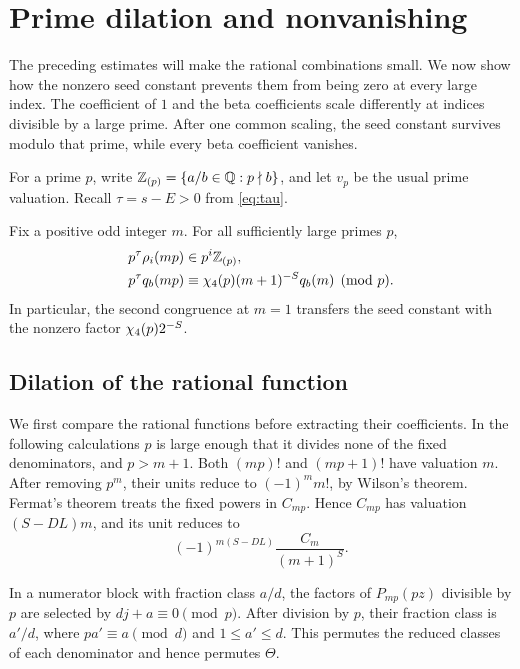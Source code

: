 \section{Prime dilation and nonvanishing}\label{sec:dilation}

The preceding estimates will make the rational combinations small.
We now show how the nonzero seed constant prevents them from being
zero at every large index. The coefficient of $1$ and the beta
coefficients scale differently at indices divisible by a large prime.
After one common scaling, the seed constant survives modulo that
prime, while every beta coefficient vanishes.

For a prime $p$, write
$\mathbb Z_{(p)}=\{a/b\in\mathbb Q:p\nmid b\}$, and let $v_p$ be the usual
prime valuation. Recall $\tau=s-E>0$ from \eqref{eq:tau}.

\begin{proposition}\label{prop:dilation}
Fix a positive odd integer $m$. For all sufficiently large primes $p$,
\begin{align}
 p^\tau\rho_i(mp)&\in p^i\mathbb Z_{(p)},\label{eq:rho-dilation}\\
 p^\tau q_b(mp)&\equiv
       \chi_4(p)(m+1)^{-S}q_b(m)\pmod p.\label{eq:q-dilation}
\end{align}
In particular, the second congruence at $m=1$ transfers the seed
constant with the nonzero factor $\chi_4(p)2^{-S}$.
\end{proposition}

\subsection{Dilation of the rational function}

We first compare the rational functions before extracting their
coefficients. In the following calculations $p$ is large enough
that it divides none of the fixed denominators, and $p>m+1$.
Both $(mp)!$ and $(mp+1)!$ have valuation $m$. After removing
$p^m$, their units reduce to $(-1)^m m!$, by Wilson's theorem.
Fermat's theorem treats the fixed powers in $C_{mp}$. Hence
$C_{mp}$ has valuation $(S-DL)m$, and its unit reduces to
\begin{equation}\label{eq:C-unit}
 (-1)^{m(S-DL)}\frac{C_m}{(m+1)^S}.
\end{equation}

In a numerator block with fraction class $a/d$, the factors of
$P_{mp}(pz)$ divisible by $p$ are selected by
$dj+a\equiv0\pmod p$. After division by $p$, their fraction class
is $a'/d$, where $pa'\equiv a\pmod d$ and $1\le a'\le d$.
This permutes the reduced classes of each denominator and hence
permutes $\Theta$.

